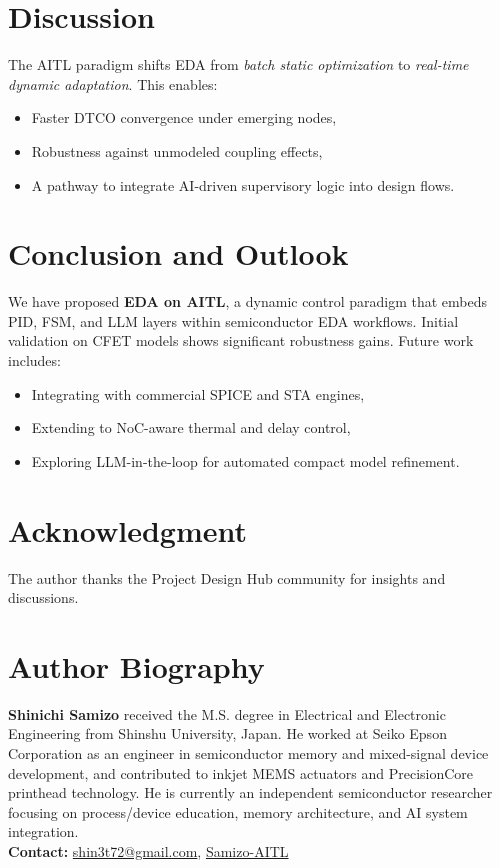 \documentclass[conference]{IEEEtran}
\begin{document}
\section{Discussion}
The AITL paradigm shifts EDA from \emph{batch static optimization} 
to \emph{real-time dynamic adaptation}. 
This enables:
\begin{itemize}
  \item Faster DTCO convergence under emerging nodes,
  \item Robustness against unmodeled coupling effects,
  \item A pathway to integrate AI-driven supervisory logic into design flows.
\end{itemize}

\section{Conclusion and Outlook}
We have proposed \textbf{EDA on AITL}, 
a dynamic control paradigm that embeds PID, FSM, and LLM layers 
within semiconductor EDA workflows. 
Initial validation on CFET models shows significant robustness gains. 
Future work includes:
\begin{itemize}
  \item Integrating with commercial SPICE and STA engines,
  \item Extending to NoC-aware thermal and delay control,
  \item Exploring LLM-in-the-loop for automated compact model refinement.
\end{itemize}

\section*{Acknowledgment}
The author thanks the Project Design Hub community for insights and discussions.




\section*{Author Biography}
\noindent\textbf{Shinichi Samizo}
received the M.S. degree in Electrical and Electronic Engineering from Shinshu University, Japan.
He worked at Seiko Epson Corporation as an engineer in semiconductor memory and mixed-signal device development,
and contributed to inkjet MEMS actuators and PrecisionCore printhead technology.
He is currently an independent semiconductor researcher focusing on process/device education,
memory architecture, and AI system integration.\\[2pt]
\textbf{Contact:} \href{mailto:shin3t72@gmail.com}{shin3t72@gmail.com},
\href{https://github.com/Samizo-AITL}{Samizo-AITL}
\end{document}
